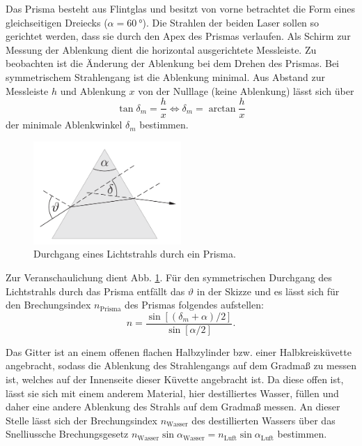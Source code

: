 			Das Prisma besteht aus Flintglas und besitzt von vorne betrachtet die Form eines gleichseitigen Dreiecks ($\alpha = \SI{60}{\degree}$).
			Die Strahlen der beiden Laser sollen so gerichtet werden, dass sie durch den Apex des Prismas verlaufen.
			Als Schirm zur Messung der Ablenkung dient die horizontal ausgerichtete Messleiste.
			Zu beobachten ist die Änderung der Ablenkung bei dem Drehen des Prismas.
			Bei symmetrischem Strahlengang ist die Ablenkung minimal.
			Aus Abstand zur Messleiste $h$ und Ablenkung $x$ von der Nulllage (keine Ablenkung) lässt sich über
			\begin{equation} \label{eq:Winkler}
				\tan \delta_m = \frac{h}{x} \Leftrightarrow \delta_m = \arctan \frac{h}{x}
			\end{equation}
			der minimale Ablenkwinkel $\delta_m$ bestimmen.
			\begin{figure}[ht]
				\centering
				\includegraphics[width=0.5\textwidth]{bilder/prisma.png}
				\caption{Durchgang eines Lichtstrahls durch ein Prisma.\cite{WWU}}
				\label{fig:Prisma}	
			\end{figure}
			Zur Veranschaulichung dient Abb. \ref{fig:Prisma}.
			Für den symmetrischen Durchgang des Lichtstrahls durch das Prisma entfällt das $\vartheta$ in der Skizze und  es lässt sich für den Brechungsindex $n_\text{Prisma}$ des Prismas folgendes aufstellen:
			\begin{equation} \label{eq:nPrisma}
				n = \frac{\sin[(\delta_m + \alpha) / 2]}{\sin [\alpha / 2]}.
			\end{equation} 
			
			Das Gitter ist an einem offenen flachen Halbzylinder bzw. einer Halbkreisküvette angebracht, sodass die Ablenkung des Strahlengangs auf dem Gradmaß zu messen ist, welches auf der Innenseite dieser Küvette angebracht ist.
			Da diese offen ist, lässt sie sich mit einem anderem Material, hier destilliertes Wasser, füllen und daher eine andere Ablenkung des Strahls auf dem Gradmaß messen.
			An dieser Stelle lässt sich der Brechungsindex $n_\text{Wasser}$ des destillierten Wassers über das Snelliussche Brechungsgesetz $n_\text{Wasser} \sin \alpha_\text{Wasser} = n_\text{Luft} \sin \alpha_\text{Luft}$ bestimmen.
			
